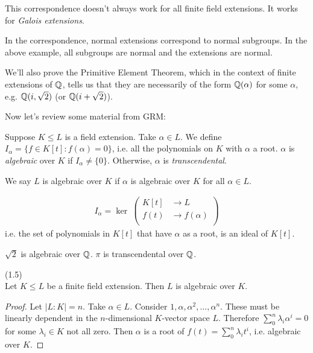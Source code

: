 \documentclass[a4paper]{article}
\begin{document}
This correspondence doesn't always work for all finite field extensions. It works for \emph{Galois extensions}.

In the correspondence, normal extensions correspond to normal subgroups. In the above example, all subgroups are normal and the extensions are normal.

We'll also prove the Primitive Element Theorem, which in the context of finite extensions of $\mathbb{Q}$, tells us that they are necessarily of the form $\mathbb{Q}(\alpha)$ for some $\alpha$, e.g. $\mathbb{Q}(i,\sqrt{2})$ (or $\mathbb{Q}(i+\sqrt{2})$).

Now let's review some material from GRM:

\begin{defi}
Suppose $K \leq L$ is a field extension. Take $\alpha \in L$. We define $I_\alpha = \{f \in K[t] : f(\alpha) = 0\}$, i.e. all the polynomials on $K$ with $\alpha$ a root. $\alpha$ is \emph{algebraic} over $K$ if $I_\alpha \neq \{0\}$. Otherwise, $\alpha$ is \emph{transcendental}.

We say $L$ is algebraic over $K$ if $\alpha$ is algebraic over $K$ for all $\alpha \in L$.
\end{defi}

\begin{rem}
\begin{equation*}
\begin{aligned}
I_\alpha = \ker\ \left(
\begin{array}{ll}
K[t] &\to L\\
f(t) &\to f(\alpha)\\
\end{array}
\right)
\end{aligned}
\end{equation*}
i.e. the set of polynomials in $K[t]$ that have $\alpha$ as a root, is an ideal of $K[t]$.
\end{rem}

\begin{eg}
$\sqrt{2}$ is algebraic over $\mathbb{Q}$. $\pi$ is transcendental over $\mathbb{Q}$.
\end{eg}

\begin{lemma}(1.5)\\
Let $K \leq L$ be a finite field extension. Then $L$ is algebraic over $K$.
\begin{proof}
Let $|L:K| = n$. Take $\alpha \in L$. Consider $1,\alpha,\alpha^2,...,\alpha^n$. These must be linearly dependent in the $n$-dimensional $K$-vector space $L$. Therefore $\sum_0^n \lambda_i \alpha^i=0$ for some $\lambda_i \in K$ not all zero. Then $\alpha$ is a root of $f(t) = \sum_0^n \lambda_i t^i$, i.e. algebraic over $K$.
\end{proof}
\end{lemma}
\end{document}
